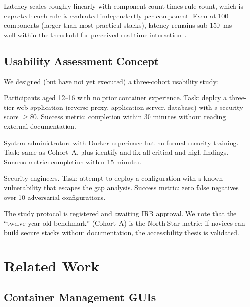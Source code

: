 \documentclass[11pt,twocolumn]{article}
\begin{document}
Latency scales roughly linearly with component count times rule count,
which is expected: each rule is evaluated independently per component.
Even at 100 components (larger than most practical stacks), latency
remains sub-150~ms---well within the threshold for perceived
real-time interaction~\cite{nielsen1994}.

\subsection{Usability Assessment Concept}
\label{sec:eval-usability}

We designed (but have not yet executed) a three-cohort usability study:

\begin{description}[leftmargin=*]
\item[Cohort~A (Novices):] Participants aged 12--16 with no prior
  container experience. Task: deploy a three-tier web application
  (reverse proxy, application server, database) with a security score
  $\geq$80. Success metric: completion within 30 minutes without
  reading external documentation.

\item[Cohort~B (Intermediate):] System administrators with Docker
  experience but no formal security training. Task: same as Cohort~A,
  plus identify and fix all critical and high findings. Success
  metric: completion within 15 minutes.

\item[Cohort~C (Expert):] Security engineers. Task: attempt to deploy
  a configuration with a known vulnerability that escapes the gap
  analysis. Success metric: zero false negatives over 10 adversarial
  configurations.
\end{description}

The study protocol is registered and awaiting IRB approval. We note
that the ``twelve-year-old benchmark'' (Cohort~A) is the North Star
metric: if novices can build secure stacks without documentation,
the accessibility thesis is validated.


\section{Related Work}
\label{sec:related}

\subsection{Container Management GUIs}
\end{document}
